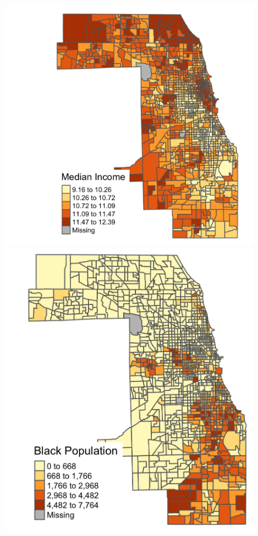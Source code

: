  
\begin{figure}[!h]
\begin{center}
\includegraphics[scale=0.13]{pics/income.png}
\includegraphics[scale=0.13]{pics/black-census.png}

\end{center}
\end{figure}
